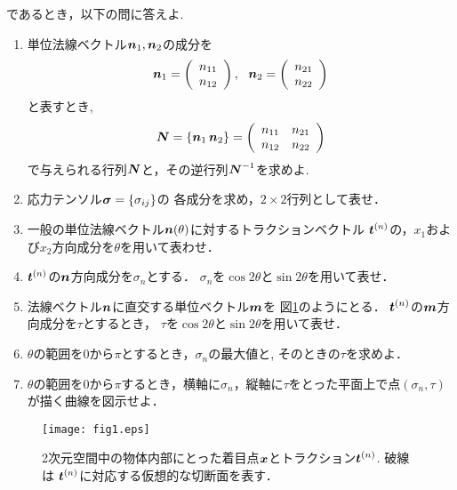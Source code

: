 \documentclass[10pt,a4j]{jarticle}
\begin{document}
であるとき，以下の問に答えよ.
\begin{enumerate}
\item
	単位法線ベクトル$\mbox{\boldmath $n$}_1, \mbox{\boldmath $n$}_2$の成分を
	\[
	\fat{n}_1=
	\left(
		\begin{array}{c}
			n_{11} \\
			n_{12}
		\end{array}
	\right), \ \ 
	\fat{n}_2=
	\left(
		\begin{array}{c}
			n_{21}\\
			n_{22}
		\end{array}
	\right)
	\]
	と表すとき,
	\[
		\mbox{\boldmath $N$}=\left\{ \mbox{\boldmath $n$}_1 \, \mbox{\boldmath $n$}_2 \right\} =
		\left(
		\begin{array}{cc}
			n_{11} & n_{21}  \\
			n_{12} & n_{22} 
		\end{array}
		\right)
	\]
	で与えられる行列$\mbox{\boldmath $N$}$と，その逆行列$\mbox{\boldmath $N$}^{-1}$を求めよ.
\item
	応力テンソル$\mbox{\boldmath $\sigma$}=\left\{\sigma_{ij}\right\}$の
	各成分を求め，$2\times 2$行列として表せ．
\item
	一般の単位法線ベクトル$\mbox{\boldmath $n$}(\theta)$に対するトラクションベクトル
	$\mbox{\boldmath $t$}^{(n)}$の，$x_1$および$x_2$方向成分を$\theta$を用いて表わせ．
\item
	$\mbox{\boldmath $t$}^{(n)}$の$\mbox{\boldmath $n$}$方向成分を$\sigma_n$とする．
	$\sigma_n$を$\cos 2\theta$と$\sin 2\theta$を用いて表せ．
\item
	法線ベクトル$\mbox{\boldmath $n$}$に直交する単位ベクトル$\mbox{\boldmath $m$}$を
	図\ref{fig:fig1}のようにとる．
	$\mbox{\boldmath $t$}^{(n)}$の$\mbox{\boldmath $m$}$方向成分を$\tau$とするとき，
	$\tau$を$\cos 2\theta$と$\sin 2\theta$を用いて表せ．
\item
	$\theta$の範囲を$0$から$\pi$とするとき，$\sigma_n$の最大値と, 
	そのときの$\tau$を求めよ．
\item
	$\theta$の範囲を$0$から$\pi$するとき，横軸に$\sigma_n$，縦軸に$\tau$をとった平面上で点$(\sigma_n, \tau)$が描く曲線を図示せよ．
\end{enumerate}
\begin{figure}[h]
	\begin{center}
	\texttt{[image: fig1.eps]} 
	\end{center}
	\caption{
		2次元空間中の物体内部にとった着目点$\mbox{\boldmath $x$}$とトラクション$\mbox{\boldmath $t$}^{(n)}$.
		破線は $\mbox{\boldmath $t$}^{(n)}$に対応する仮想的な切断面を表す．	
	} 
	\label{fig:fig1}
\end{figure}
\end{document}
